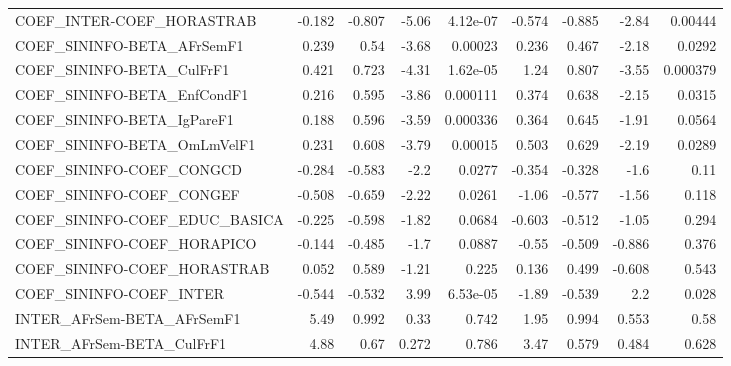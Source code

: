 \begin{tabular}{lrrrrrrrr}
COEF\_INTER-COEF\_HORASTRAB             &      -0.182 &       -0.807 &   -5.06 & 4.12e-07 &     -0.574 &      -0.885 &        -2.84 &       0.00444 \\
COEF\_SININFO-BETA\_AFrSemF1            &       0.239 &         0.54 &   -3.68 &  0.00023 &      0.236 &       0.467 &        -2.18 &        0.0292 \\
COEF\_SININFO-BETA\_CulFrF1             &       0.421 &        0.723 &   -4.31 & 1.62e-05 &       1.24 &       0.807 &        -3.55 &      0.000379 \\
COEF\_SININFO-BETA\_EnfCondF1           &       0.216 &        0.595 &   -3.86 & 0.000111 &      0.374 &       0.638 &        -2.15 &        0.0315 \\
COEF\_SININFO-BETA\_IgPareF1            &       0.188 &        0.596 &   -3.59 & 0.000336 &      0.364 &       0.645 &        -1.91 &        0.0564 \\
COEF\_SININFO-BETA\_OmLmVelF1           &       0.231 &        0.608 &   -3.79 &  0.00015 &      0.503 &       0.629 &        -2.19 &        0.0289 \\
COEF\_SININFO-COEF\_CONGCD              &      -0.284 &       -0.583 &    -2.2 &   0.0277 &     -0.354 &      -0.328 &         -1.6 &          0.11 \\
COEF\_SININFO-COEF\_CONGEF              &      -0.508 &       -0.659 &   -2.22 &   0.0261 &      -1.06 &      -0.577 &        -1.56 &         0.118 \\
COEF\_SININFO-COEF\_EDUC\_BASICA         &      -0.225 &       -0.598 &   -1.82 &   0.0684 &     -0.603 &      -0.512 &        -1.05 &         0.294 \\
COEF\_SININFO-COEF\_HORAPICO            &      -0.144 &       -0.485 &    -1.7 &   0.0887 &      -0.55 &      -0.509 &       -0.886 &         0.376 \\
COEF\_SININFO-COEF\_HORASTRAB           &       0.052 &        0.589 &   -1.21 &    0.225 &      0.136 &       0.499 &       -0.608 &         0.543 \\
COEF\_SININFO-COEF\_INTER               &      -0.544 &       -0.532 &    3.99 & 6.53e-05 &      -1.89 &      -0.539 &          2.2 &         0.028 \\
INTER\_AFrSem-BETA\_AFrSemF1            &        5.49 &        0.992 &    0.33 &    0.742 &       1.95 &       0.994 &        0.553 &          0.58 \\
INTER\_AFrSem-BETA\_CulFrF1             &        4.88 &         0.67 &   0.272 &    0.786 &       3.47 &       0.579 &        0.484 &         0.628 \\

\end{tabular}
